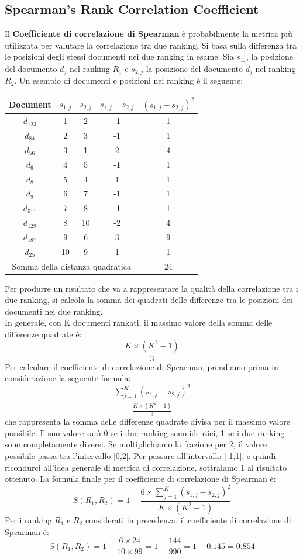 \documentclass{report}
\begin{document}
	\subsection{Spearman's Rank Correlation Coefficient}
	Il \textbf{Coefficiente di correlazione di Spearman} è probabilmente la metrica più utilizzata per valutare la correlazione tra due ranking. Si basa sulla differenza tra le posizioni degli stessi documenti nei due ranking in esame. Sia $s_{1,j}$ la posizione del documento $d_j$ nel ranking $R_1$ e $s_{2,j}$ la posizione del documento $d_j$ nel ranking $R_2$. Un esempio di documenti e posizioni nei ranking è il seguente:
	\begin{table}[H]
		\centering
		\begin{tabular}{|c|c|c|c|c|}
			\hline
			\textbf{Document} & \textbf{$s_{1,j}$} & \textbf{$s_{2,j}$} & \textbf{$s_{1,j} - s_{2,j}$} & \textbf{$(s_{1,j} - s_{2,j})^2$}\\ 
			\hline
			$d_123$ & 1 & 2 & -1 & 1\\
			$d_84$ & 2 & 3 & -1 & 1\\
			$d_56$ & 3 & 1 & 2 & 4\\
			$d_6$ & 4 & 5 & -1 & 1\\
			$d_8$ & 5 & 4 & 1 & 1\\
			$d_9$ & 6 & 7 & -1 & 1\\
			$d_511$ & 7 & 8 & -1 & 1\\
			$d_129$ & 8 & 10 & -2 & 4\\
			$d_187$ & 9 & 6 & 3 & 9\\
			$d_25$ & 10 & 9 & 1 & 1\\
			\hline
			\multicolumn{4}{|c|}{Somma della distanza quadratica} & 24\\
			\hline
		\end{tabular}
	\end{table}
	Per produrre un risultato che va a rappresentare la qualità della correlazione tra i due ranking, si calcola la somma dei quadrati delle differenze tra le posizioni dei documenti nei due ranking.
	\vspace{\baselineskip}\\
	In generale, con K documenti rankati, il massimo valore della somma delle differenze quadrate è:
	\[
		\frac{K \times (K^2 - 1)}{3}
	\]
	Per calcolare il coefficiente di correlazione di Spearman, prendiamo prima in considerazione la seguente formula:
	\[
		\frac{\sum_{j=1}^{K} (s_{1,j} - s_{2,j})^2}{\frac{K \times (K^2 - 1)}{3}}
	\]
	che rappresenta la somma delle differenze quadrate divisa per il massimo valore possibile. Il suo valore sarà 0 se i due ranking sono identici, 1 se i due ranking sono completamente diversi. Se moltiplichiamo la frazione per 2, il valore possibile passa tra l'intervallo [0,2]. Per passare all'intervallo [-1,1], e quindi ricondurci all'idea generale di metrica di correlazione, sottraiamo 1 al risultato ottenuto. La formula finale per il coefficiente di correlazione di Spearman è:
	\[
		S(R_1, R_2) = 1 - \frac{6 \times \sum_{j=1}^{K} (s_{1,j} - s_{2,j})^2}{K \times (K^2 - 1)}
	\]
	Per i ranking $R_1$ e $R_2$ considerati in precedenza, il coefficiente di correlazione di Spearman è:
	\[
		S(R_1, R_2) = 1 - \frac{6 \times 24}{10 \times 99} = 1 - \frac{144}{990} = 1 - 0.145 = 0.854
	\]
\end{document}
